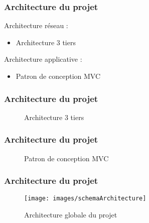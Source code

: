 \begin{frame}
  \frametitle{Architecture du projet}
	
  Architecture réseau :
      \begin{itemize}
        \item Architecture 3 tiers
      \end{itemize}
  Architecture applicative :
      \begin{itemize}
        \item Patron de conception MVC
      \end{itemize}
\end{frame}

\begin{frame}
  \frametitle{Architecture du projet}

  
  \begin{figure}[!h]
	\begin{center}
	
	\caption{\label{3tiers_schema} Architecture 3 tiers}
	\end{center}
  \end{figure}

\end{frame}




\begin{frame}
  \frametitle{Architecture du projet}

  \begin{figure}[!h]
	\begin{center}
	
	\caption{\label{3tiers_schema} Patron de conception MVC}
	\end{center}
  \end{figure}	
	
\end{frame}



\begin{frame}
  \frametitle{Architecture du projet}

  \begin{figure}[!h]
	\begin{center}
	\texttt{[image: images/schemaArchitecture]}
	\caption{\label{archi_schema} Architecture globale du projet}
	\end{center}
  \end{figure}	
	
\end{frame}
